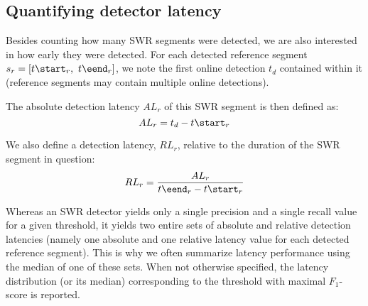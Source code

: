 \subsection{Quantifying detector latency}

Besides counting how many SWR segments were detected, we are also interested in how early they were detected. For each detected reference segment $s_r = [ t\start_r,\ t\eend_r ]$, we note the first online detection $t_d$ contained within it (reference segments may contain multiple online detections).

The absolute detection latency $AL_r$ of this SWR segment is then defined as:
\begin{equation}
AL_r = t_d - t\start_r 
\end{equation}

We also define a detection latency, $RL_r$, relative to the duration of the SWR segment in question:
\begin{equation}
RL_r = \frac{AL_r}{t\eend_r - t\start_r} 
\end{equation}

Whereas an SWR detector yields only a single precision and a single recall value for a given threshold, it yields two entire sets of absolute and relative detection latencies (namely one absolute and one relative latency value for each detected reference segment). This is why we often summarize latency performance using the median of one of these sets. When not otherwise specified, the latency distribution (or its median) corresponding to the threshold with maximal $F_1$-score is reported.
